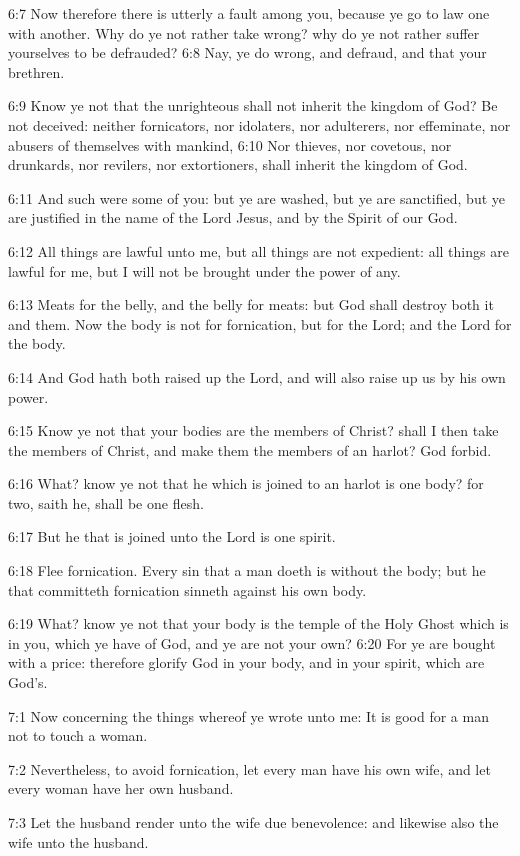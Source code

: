 6:7 Now therefore there is utterly a fault among you, because ye go to
law one with another. Why do ye not rather take wrong? why do ye not
rather suffer yourselves to be defrauded?  6:8 Nay, ye do wrong, and
defraud, and that your brethren.

6:9 Know ye not that the unrighteous shall not inherit the kingdom of
God?  Be not deceived: neither fornicators, nor idolaters, nor
adulterers, nor effeminate, nor abusers of themselves with mankind,
6:10 Nor thieves, nor covetous, nor drunkards, nor revilers, nor
extortioners, shall inherit the kingdom of God.

6:11 And such were some of you: but ye are washed, but ye are
sanctified, but ye are justified in the name of the Lord Jesus, and by
the Spirit of our God.

6:12 All things are lawful unto me, but all things are not expedient:
all things are lawful for me, but I will not be brought under the
power of any.

6:13 Meats for the belly, and the belly for meats: but God shall
destroy both it and them. Now the body is not for fornication, but for
the Lord; and the Lord for the body.

6:14 And God hath both raised up the Lord, and will also raise up us
by his own power.

6:15 Know ye not that your bodies are the members of Christ? shall I
then take the members of Christ, and make them the members of an
harlot? God forbid.

6:16 What? know ye not that he which is joined to an harlot is one
body?  for two, saith he, shall be one flesh.

6:17 But he that is joined unto the Lord is one spirit.

6:18 Flee fornication. Every sin that a man doeth is without the body;
but he that committeth fornication sinneth against his own body.

6:19 What? know ye not that your body is the temple of the Holy Ghost
which is in you, which ye have of God, and ye are not your own?  6:20
For ye are bought with a price: therefore glorify God in your body,
and in your spirit, which are God's.

7:1 Now concerning the things whereof ye wrote unto me: It is good for
a man not to touch a woman.

7:2 Nevertheless, to avoid fornication, let every man have his own
wife, and let every woman have her own husband.

7:3 Let the husband render unto the wife due benevolence: and likewise
also the wife unto the husband.

